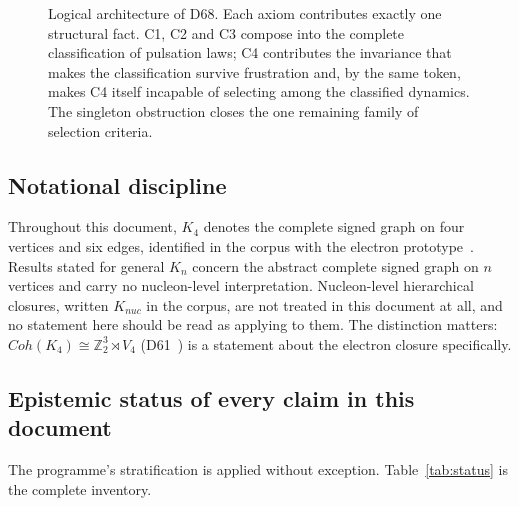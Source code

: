 \documentclass[11pt,a4paper]{article}
\def\mathrm#1{#1}%
\newcommand{\Kfour}{K_4}
\newcommand{\Kn}{K_n}
\newcommand{\Coh}{\mathrm{Coh}}
\begin{document}
\begin{figure}[htbp]
\begin{tikzpicture}
\end{tikzpicture}
\caption{Logical architecture of D68. Each axiom contributes exactly one structural fact. C1, C2 and C3 compose into the complete classification of pulsation laws; C4 contributes the invariance that makes the classification survive frustration and, by the same token, makes C4 itself incapable of selecting among the classified dynamics. The singleton obstruction closes the one remaining family of selection criteria.}
\label{fig:chain}
\end{figure}

\subsection{Notational discipline}
\label{subsec:notation}

Throughout this document, $\Kfour$ denotes the complete signed graph on four vertices and six edges, identified in the corpus with the electron prototype~\citep{D01,D16}. Results stated for general $\Kn$ concern the abstract complete signed graph on $n$ vertices and carry no nucleon-level interpretation. Nucleon-level hierarchical closures, written $K_{\mathrm{nuc}}$ in the corpus, are not treated in this document at all, and no statement here should be read as applying to them. The distinction matters: $\Coh(\Kfour)\cong\mathbb{Z}_2^3\rtimes V_4$ (D61~\citep{D61}) is a statement about the electron closure specifically.

\subsection{Epistemic status of every claim in this document}

The programme's stratification is applied without exception. Table~\ref{tab:status} is the complete inventory.
\end{document}

